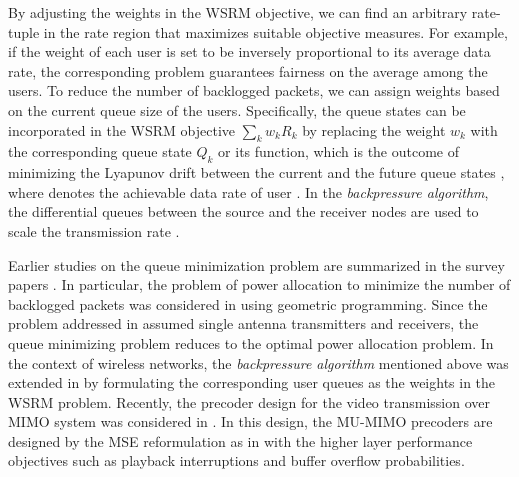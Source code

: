 By adjusting the weights in the \ac{WSRM} objective, we can find an arbitrary rate-tuple in the rate region that maximizes suitable objective measures. For example, if the weight of each user is set to be inversely proportional to its average data rate, the corresponding problem guarantees fairness on the average among the users. To reduce the number of backlogged packets, we can assign weights based on the current queue size of the users. Specifically, the queue states can be incorporated in the \ac{WSRM} objective $\sum_k w_k R_k$ by replacing the weight $w_k$ with the corresponding queue state $Q_k$ or its function, which is the outcome of minimizing the Lyapunov drift between the current and the future queue states \cite{neely2010stochastic}, where  denotes the achievable data rate of user . In the \textit{backpressure algorithm}, the differential queues between the source and the receiver nodes are used to scale the transmission rate \cite{georgiadis2006resource}.

Earlier studies on the queue minimization problem are summarized in the survey papers \cite{berry2004cross,layering_as_opt}. In particular, the problem of power allocation to minimize the number of backlogged packets was considered in \cite{qps_cioffi} using geometric programming. Since the problem addressed in \cite{qps_cioffi} assumed single antenna transmitters and receivers, the queue minimizing problem reduces to the optimal power allocation problem. In the context of wireless networks, the \textit{backpressure algorithm} mentioned above was extended in \cite{weeraddana2011resource} by formulating the corresponding user queues as the weights in the \ac{WSRM} problem. Recently, the precoder design for the video transmission over \ac{MIMO} system was considered in \cite{video_queues}. In this design, the \ac{MU}-\ac{MIMO} precoders are designed by the \ac{MSE} reformulation as in \cite{christensen2008weighted} with the higher layer performance objectives such as playback interruptions and buffer overflow probabilities.

